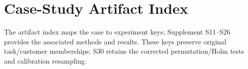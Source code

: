 \section{Case-Study Artifact Index}\label{app:experiments}
The artifact index maps the case to experiment keys; Supplement S11--S26 provides the associated methods and results. These keys preserve original task/customer memberships; S30 retains the corrected permutation/Holm tests and calibration resampling.
